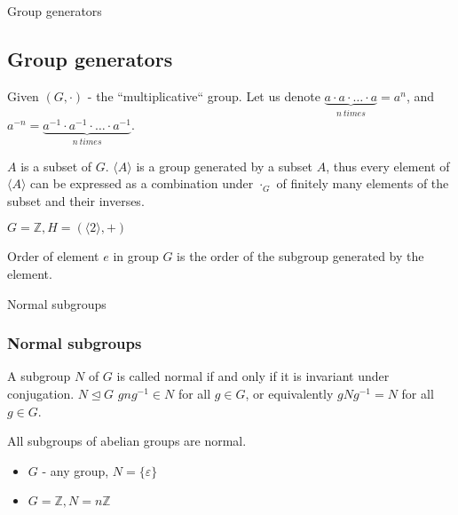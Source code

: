 \documentclass{beamer}
\begin{document}
\begin{frame}{Group generators}
	\subsection{Group generators}
	\begin{definition}
		Given $(G, \cdot)$ - the ``multiplicative`` group. \newline
		Let us denote $\underbrace{a \cdot a \cdot \ldots \cdot a}_{n\ times} = a^n$, and \newline
		$a^{-n} = \underbrace{a^{-1} \cdot a^{-1} \cdot \ldots \cdot a^{-1}}_{n\ times}$.
	\end{definition}
	\begin{definition}
		$A$ is a subset of $G$.
		$\langle A \rangle$ is a group generated by a subset $A$, thus every 
		element of $\langle A \rangle$ can be expressed as a combination under 
		$\cdot_G$ of finitely many elements of the subset and their inverses.
		 
	\end{definition}
	
	\begin{example}
		$G = \mathbb{Z}, H = (\langle 2 \rangle, +)$
	\end{example}
	\begin{definition}
		Order of element $e$ in group $G$ is the order of the subgroup generated by the element.
	\end{definition}
\end{frame}

\begin{frame}{Normal subgroups}
	\subsubsection*{Normal subgroups}
	\begin{definition}
		A subgroup $N$ of $G$ is called normal if and only if it is invariant under conjugation. \newline
		$N \unlhd G$ \newline
		$g n g^{-1} \in N$ for all $g \in G$, or equivalently \newline 
		$g N g^{-1} = N$ for all $g \in G$.
	\end{definition}
	\begin{prop}
		All subgroups of abelian groups are normal.
	\end{prop}
	\begin{example}
		\begin{itemize}
			\item $G$ - any group, $N = \{\varepsilon\}$
			\item $G = \mathbb{Z}, N = n\mathbb{Z}$
		\end{itemize}
	\end{example}
\end{frame}
\end{document}
